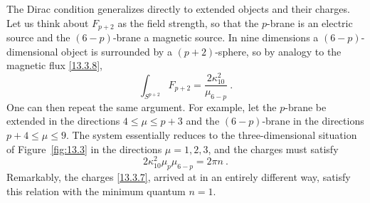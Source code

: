 The Dirac condition generalizes directly to extended objects and their charges. Let us think about $F_{p+2}$ as the field strength, so that the $p$-brane is an electric source and the $(6-p)$-brane a magnetic source. In nine dimensions a $(6-p)$-dimensional object is surrounded by a $(p+2)$-sphere, so by analogy to the magnetic flux \eqref{13.3.8},
\begin{equation}
	\int_{S^{p+2}} F_{p+2} = \frac{2\kappa_{10}^2}{\mu_{6-p}} \:. \label{13.3.12}
\end{equation}
One can then repeat the same argument. For example, let the $p$-brane be extended in the directions $4 \le \mu \le p+3$ and the $(6-p)$-brane in the directions $p+4 \le \mu \le 9$. The system essentially reduces to the three-dimensional situation of Figure~\ref{fig:13.3} in the directions $\mu = 1, 2, 3$, and the charges must satisfy
\begin{equation}
	2\kappa_{10}^2\mu_p\mu_{6-p} = 2\pi n \:. \label{13.3.13}
\end{equation}
Remarkably, the charges \eqref{13.3.7}, arrived at in an entirely different way, satisfy this relation with the minimum quantum $n = 1$.
